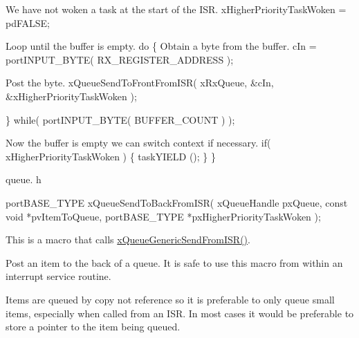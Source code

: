 \begin{DoxyPre}We have not woken a task at the start of the ISR.
        xHigherPriorityTaskWoken = pdFALSE;\end{DoxyPre}



\begin{DoxyPre}Loop until the buffer is empty.
        do
        \{
Obtain a byte from the buffer.
                cIn = portINPUT\_BYTE( RX\_REGISTER\_ADDRESS );\end{DoxyPre}



\begin{DoxyPre}Post the byte.
                xQueueSendToFrontFromISR( xRxQueue, &cIn, &xHigherPriorityTaskWoken );\end{DoxyPre}



\begin{DoxyPre}        \} while( portINPUT\_BYTE( BUFFER\_COUNT ) );\end{DoxyPre}



\begin{DoxyPre}Now the buffer is empty we can switch context if necessary.
        if( xHigherPriorityTaskWoken )
        \{
                taskYIELD ();
        \}
 \}
 \end{DoxyPre}


queue. h 
\begin{DoxyPre}
 portBASE\_TYPE xQueueSendToBackFromISR(
                                                                                 xQueueHandle pxQueue,
                                                                                 const void *pvItemToQueue,
                                                                                 portBASE\_TYPE *pxHigherPriorityTaskWoken
                                                                          );
 \end{DoxyPre}


This is a macro that calls \hyperlink{_common_2_libraries_2_free_r_t_o_s_2_source_2include_2queue_8h_a5f3e29eed8f166215648bc6465ebdb04}{x\-Queue\-Generic\-Send\-From\-I\-S\-R()}.

Post an item to the back of a queue. It is safe to use this macro from within an interrupt service routine.

Items are queued by copy not reference so it is preferable to only queue small items, especially when called from an I\-S\-R. In most cases it would be preferable to store a pointer to the item being queued.


